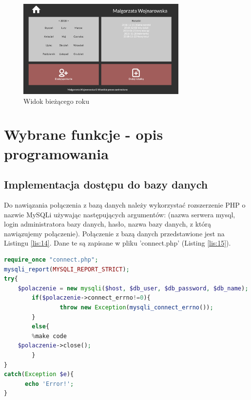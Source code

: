 \documentclass[eng,printmode,openany,oneside]{mgr}
\begin{document}
	
	\begin{figure}[H]
		\centering
		\includegraphics[width=0.75\textwidth]{rok}
		\caption{Widok bieżącego roku}
		\label{fig:23}
	\end{figure}



\section{Wybrane funkcje - opis programowania}

\subsection{Implementacja dostępu do bazy danych}

Do nawiązania połączenia z bazą danych należy wykorzystać rozszerzenie PHP o nazwie MySQLi używając następujących argumentów: (nazwa serwera mysql, login administratora bazy danych, hasło, nazwa bazy danych, z którą nawiązujemy połączenie). Połączenie z bazą danych przedstawione jest na Listingu \ref{lis:14}. Dane te są zapisane w pliku 'connect.php' (Listing \ref{lis:15}).




\begin{lstlisting}[caption={Połączenie z bazą danych}, language=PHP, label={lis:14}]
require_once "connect.php";
mysqli_report(MYSQLI_REPORT_STRICT);
try{      
	$polaczenie = new mysqli($host, $db_user, $db_password, $db_name);
      	if($polaczenie->connect_errno!=0){
        		throw new Exception(mysqli_connect_errno());
      	}
      	else{
      	%make code
	$polaczenie->close();
     	}
}
catch(Exception $e){
      echo 'Error!';
}
\end{lstlisting}







\newpage
\end{document}
